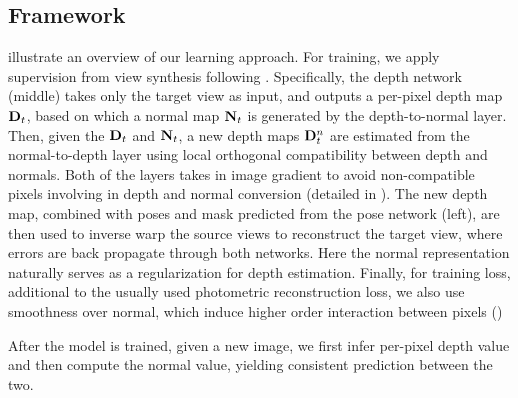 

\subsection{Framework}
 illustrate an overview of our learning approach. For training, we apply supervision from view synthesis following \cite{zhou2017unsupervised}. Specifically, the depth network (middle) takes only the target view as input, and
outputs a per-pixel depth map ${\mathbf D}_t$, based on which a normal map ${\mathbf N}_t$ is generated by the depth-to-normal layer. Then, given the ${\mathbf D}_t$ and ${\mathbf N}_t$, a new depth maps ${\mathbf D}_t^n$ are estimated from the normal-to-depth layer using local orthogonal compatibility between depth and normals. Both of the layers takes in image gradient to avoid non-compatible pixels involving in depth and normal conversion (detailed in ).
The new depth map, combined with poses and mask predicted from the pose network (left), are then used to inverse warp the source views to reconstruct the target view, where errors are back propagate through both networks. Here the normal representation naturally serves as a regularization for depth estimation. Finally, for training loss, additional to the usually used photometric reconstruction loss, we also use smoothness over normal, which induce higher order interaction between pixels ()

After the model is trained, given a new image,  we first infer per-pixel depth value and then compute the normal value, yielding consistent prediction between the two.




